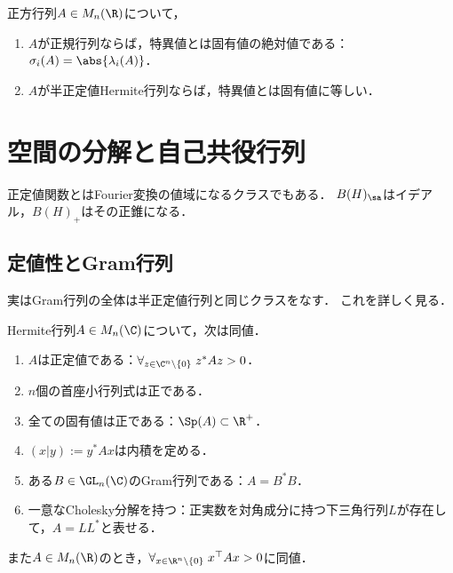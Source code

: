 \documentclass[uplatex, dvipdfmx]{jsreport}
\begin{document}
\begin{proposition}[特異値の性質]
    正方行列$A\in M_n(\R)$について，
    \begin{enumerate}
        \item $A$が正規行列ならば，特異値とは固有値の絶対値である：$\sigma_i(A)=\abs{\lambda_i(A)}$．
        \item $A$が半正定値Hermite行列ならば，特異値とは固有値に等しい．
    \end{enumerate}
\end{proposition}

\section{空間の分解と自己共役行列}

\begin{tcolorbox}[colframe=ForestGreen, colback=ForestGreen!10!white,breakable,colbacktitle=ForestGreen!40!white,coltitle=black,fonttitle=\bfseries\sffamily,
title=]
    正定値関数とはFourier変換の値域になるクラスでもある．
    $B(H)_\sa$はイデアル，$B(H)_+$はその正錐になる．
\end{tcolorbox}

\subsection{定値性とGram行列}

\begin{tcolorbox}[colframe=ForestGreen, colback=ForestGreen!10!white,breakable,colbacktitle=ForestGreen!40!white,coltitle=black,fonttitle=\bfseries\sffamily,
title=]
    実はGram行列の全体は半正定値行列と同じクラスをなす．
    これを詳しく見る．
\end{tcolorbox}

\begin{theorem}[Sylvester]
    Hermite行列$A\in M_n(\C)$について，次は同値．
    \begin{enumerate}
        \item $A$は正定値である：$\forall_{z\in\C^n\setminus\{0\}}\;z^*Az>0$．
        \item $n$個の首座小行列式は正である．
        \item 全ての固有値は正である：$\Sp(A)\subset\R^+$．
        \item $(x|y):=y^*Ax$は内積を定める．
        \item ある$B\in \GL_{n}(\C)$のGram行列である：$A=B^*B$．
        \item 一意なCholesky分解を持つ：正実数を対角成分に持つ下三角行列$L$が存在して，$A=LL^*$と表せる．
    \end{enumerate}
    また$A\in M_n(\R)$のとき，$\forall_{x\in\R^n\setminus\{0\}}\;x^\top Ax>0$に同値．
\end{theorem}
\end{document}
